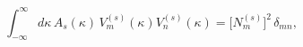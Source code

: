 \begin{equation}
\int_{-\infty}^{\infty}d\kappa\,A_s(\kappa)\,V_{m}^{(s)}(\kappa)
V_n^{(s)}(\kappa)=\bigl[N_m^{(s)}\bigr]^2\,\delta_{mn},
\label{C2}
\end{equation}

